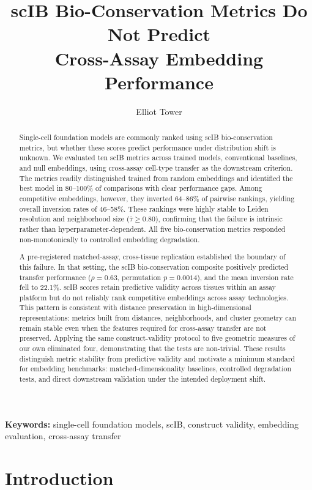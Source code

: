 \documentclass[11pt]{article}
\title{scIB Bio-Conservation Metrics Do Not Predict\\Cross-Assay Embedding Performance}
\author{Elliot Tower}
\affil{Independent Researcher \\ \texttt{elliot@elliottower.ai}}
\date{}
\begin{document}
\linenumbers
\maketitle

\begin{abstract}
Single-cell foundation models are commonly ranked using scIB
bio-conservation metrics, but whether these scores predict performance
under distribution shift is unknown. We evaluated ten scIB metrics
across trained models, conventional baselines, and null embeddings,
using cross-assay cell-type transfer as the downstream criterion.
The metrics readily distinguished trained from random embeddings and
identified the best model in 80--100\% of comparisons with clear
performance gaps. Among competitive embeddings, however, they inverted
64--86\% of pairwise rankings, yielding overall inversion rates of
46--58\%. These rankings were highly stable to Leiden resolution and
neighborhood size ($\bar{\tau} \geq 0.80$), confirming that the failure
is intrinsic rather than hyperparameter-dependent. All five
bio-conservation metrics responded non-monotonically to controlled
embedding degradation.

A pre-registered matched-assay, cross-tissue replication established
the boundary of this failure. In that setting, the scIB bio-conservation
composite positively predicted transfer performance
($\rho = 0.63$, permutation $p = 0.0014$), and the mean inversion rate
fell to 22.1\%. scIB scores retain predictive validity across
tissues within an assay platform but do not reliably rank competitive
embeddings across assay technologies. This pattern is consistent with
distance preservation in high-dimensional representations: metrics
built from distances, neighborhoods, and cluster geometry can remain
stable even when the features required for cross-assay transfer are
not preserved. Applying the same construct-validity protocol to five
geometric measures of our own eliminated four, demonstrating that the
tests are non-trivial. These results distinguish metric stability from
predictive validity and motivate a minimum standard for embedding
benchmarks: matched-dimensionality baselines, controlled degradation
tests, and direct downstream validation under the intended deployment
shift.
\end{abstract}

\noindent\textbf{Keywords:} single-cell foundation models, scIB, construct validity, embedding evaluation, cross-assay transfer


\section{Introduction}
\label{sec:intro}
\end{document}
